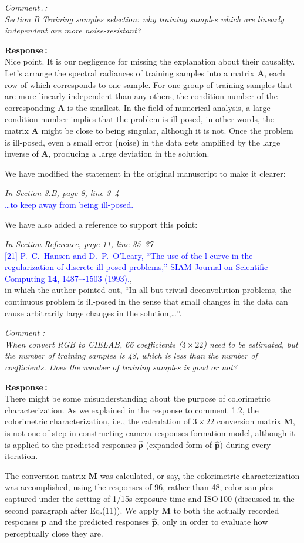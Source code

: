 \documentclass[12pt]{article}
\newcounter{comment}
\newcounter{subcomment}[comment]
\renewcommand{\thecomment}{Comment\,\arabic{comment}}
\renewcommand{\thesubcomment}{\thecomment.\arabic{subcomment}}
\newcommand{\comment}[1]{\stepcounter{comment} \bigskip \noindent 
	\textsl{{\fontseries{b}\selectfont \thecomment\,:}\medskip\\ #1}\smallskip\par}
\newcommand{\subcomment}[1]{\stepcounter{subcomment} \bigskip \noindent 
	\textsl{{\fontseries{b}\selectfont \thesubcomment\,:}\medskip\\ #1}\smallskip\par}
\newcommand{\reply}[1]{\noindent \textbf{\fontseries{b}\selectfont Response\,:}\medskip\\#1\medskip\par}
\newcommand{\add}[1]{\noindent\textcolor{blue}{#1}}
\newcommand{\pos}[1]{\noindent\emph{\small#1}}
\begin{document}
	\subcomment{
		Section B Training samples selection: why training samples which are linearly independent are more noise-resistant?}
	
	\reply{
		Nice point. It is our negligence for missing the explanation about their causality. Let's arrange the spectral radiances of training samples into a matrix $\mathbf{A}$, each row of which corresponds to one sample. For one group of training samples that are more linearly independent than any others, the condition number of the corresponding $\mathbf{A}$ is the smallest. In the field of numerical analysis, a large condition number implies that the problem is ill-posed, in other words, the matrix $\mathbf{A}$ might be close to being singular, although it is not. Once the problem is ill-posed, even a small error (noise) in the data gets amplified by the large inverse of $\mathbf{A}$, producing a large deviation in the solution.
		
		We have modified the statement in the original manuscript to make it clearer:
		
		\pos{In Section 3.B, page 8, line 3--4}\\
		\add{\ldots to keep away from being ill-posed.}
		
		We have also added a reference to support this point:
		
		\pos{In Section Reference, page 11, line 35--37}\\
		\add{[21] P.~C.~Hansen and D.~P.~O'Leary, ``The use of the l-curve in the regularization of discrete ill-posed problems,'' SIAM Journal on Scientific Computing \textbf{14}, 1487–-1503 (1993).},\\
		in which the author pointed out, ``In all but trivial deconvolution problems, the continuous problem is ill-posed in the sense that small changes in the data can cause arbitrarily large changes in the solution,\ldots''.}
	
	\comment{
		When convert RGB to CIELAB, 66 coefficients ($3\times22$) need to be estimated, but the number of training samples is 48, which is less than the number of coefficients. Does the number of training samples is good or not?}
	
	\hypertarget{comment2}{}
	\reply{
		There might be some misunderstanding about the purpose of colorimetric characterization. As we explained in the \hyperlink{comment1.2}{response to comment~1.2}, the colorimetric characterization, i.e., the calculation of $3\times22$ conversion matrix $\mathbf{M}$, is not one of step in constructing camera responses formation model, although it is applied to the predicted responses $\hat{\boldsymbol{\rho}}$ (expanded form of $\hat{\mathbf{p}}$) during every iteration. 
		
		The conversion matrix $\mathbf{M}$ was calculated, or say, the colorimetric characterization was accomplished, using the responses of 96, rather than 48, color samples captured under the setting of 1/15s exposure time and ISO\,100 (discussed in the second paragraph after Eq.(11)). We apply $\mathbf{M}$ to both the actually recorded responses $\mathbf{p}$ and the predicted responses $\hat{\mathbf{p}}$, only in order to evaluate how perceptually close they are.}
	
\end{document}
